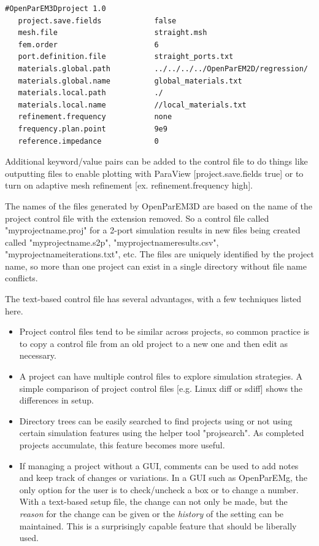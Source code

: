 \documentclass[titlepage]{article}
\renewcommand\_{\textunderscore\linebreak[1]}
\begin{document}
\begin{Verbatim}[fontsize=\small]
   #OpenParEM3Dproject 1.0
   project.save.fields            false
   mesh.file                      straight.msh
   fem.order                      6
   port.definition.file           straight_ports.txt
   materials.global.path          ../../../../OpenParEM2D/regression/
   materials.global.name          global_materials.txt
   materials.local.path           ./
   materials.local.name           //local_materials.txt
   refinement.frequency           none
   frequency.plan.point           9e9
   reference.impedance            0
\end{Verbatim}

\noindent Additional keyword/value pairs can be added to the control file to do things like outputting files to enable plotting with ParaView \cite{ParaView} [project.save.fields true] or to turn on adaptive mesh refinement [ex. refinement.frequency high].

The names of the files generated by OpenParEM3D are based on the name of the project control file with the extension removed.  So a control file called "my\_projectname.proj" for a 2-port simulation results in new files being created called "my\_projectname.s2p", "my\_projectname\_results.csv", "my\_projectname\_iterations.txt", etc.  The files are uniquely identified by the project name, so more than one project can exist in a single directory without file name conflicts.

The text-based control file has several advantages, with a few techniques listed here.
\begin{itemize}[nosep]
  \item Project control files tend to be similar across projects, so common practice is to copy a control file from an old project to a new one and then edit as necessary.
  \item A project can have multiple control files to explore simulation strategies.  A simple comparison of project control files [e.g. Linux diff or sdiff] shows the differences in setup.
  \item Directory trees can be easily searched to find projects using or not using certain simulation features using the helper tool "proj\_search".  As completed projects accumulate, this feature becomes more useful.
  \item If managing a project without a GUI, comments can be used to add notes and keep track of changes or variations.  In a GUI such as OpenParEMg, the only option for the user is to check/uncheck a box or to change a number.  With a text-based setup file, the change can not only be made, but the \textit{reason} for the change can be given or the \textit{history} of the setting can be maintained.  This is a surprisingly capable feature that should be liberally used.
\end{itemize}
\end{document}
